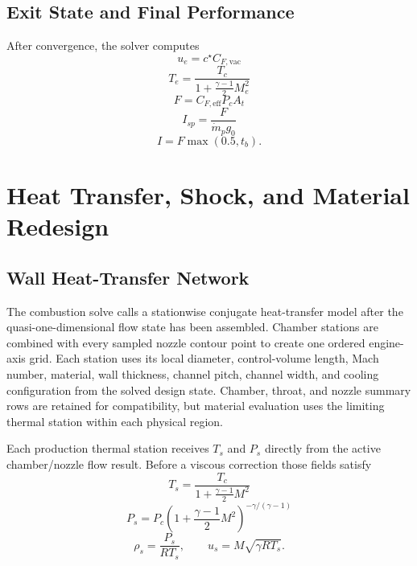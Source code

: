 \documentclass[11pt]{article}
\newcommand{\mdotp}{\dot{m}_{p}}
\begin{document}
\subsection{Exit State and Final Performance}
After convergence, the solver computes
\begin{equation}
u_e=c^\star C_{F,\text{vac}}
\label{eq:exit-velocity}
\end{equation}
\begin{equation}
T_e=\frac{T_c}{1+\frac{\gamma-1}{2}M_e^2}
\label{eq:exit-temp}
\end{equation}
\begin{equation}
F=C_{F,\text{eff}}P_cA_t
\label{eq:final-thrust}
\end{equation}
\begin{equation}
I_{sp}=\frac{F}{\mdotp g_0}
\label{eq:isp}
\end{equation}
\begin{equation}
I=F\max(0.5,t_b).
\label{eq:impulse-final}
\end{equation}

\section{Heat Transfer, Shock, and Material Redesign}
\subsection{Wall Heat-Transfer Network}
The combustion solve calls a stationwise conjugate heat-transfer model after the quasi-one-dimensional flow state has been assembled. Chamber stations are combined with every sampled nozzle contour point to create one ordered engine-axis grid. Each station uses its local diameter, control-volume length, Mach number, material, wall thickness, channel pitch, channel width, and cooling configuration from the solved design state. Chamber, throat, and nozzle summary rows are retained for compatibility, but material evaluation uses the limiting thermal station within each physical region.

Each production thermal station receives $T_s$ and $P_s$ directly from the active chamber/nozzle flow result. Before a viscous correction those fields satisfy
\begin{equation}
T_s=\frac{T_c}{1+\frac{\gamma-1}{2}M^2}
\label{eq:heat-static-temperature}
\end{equation}
\begin{equation}
P_s=P_c\left(1+\frac{\gamma-1}{2}M^2\right)^{-\gamma/(\gamma-1)}
\label{eq:heat-static-pressure}
\end{equation}
\begin{equation}
\rho_s=\frac{P_s}{RT_s},
\qquad
u_s=M\sqrt{\gamma RT_s}.
\label{eq:heat-density-velocity}
\end{equation}
\end{document}
